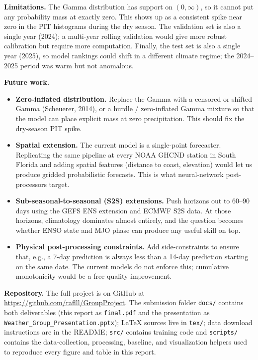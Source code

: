 \documentclass[11pt]{article}
\begin{document}
\textbf{Limitations.} The Gamma distribution has support on $(0, \infty)$, so it cannot put any probability mass at exactly zero. This shows up as a consistent spike near zero in the PIT histograms during the dry season. The validation set is also a single year (2024); a multi-year rolling validation would give more robust calibration but require more computation. Finally, the test set is also a single year (2025), so model rankings could shift in a different climate regime; the 2024--2025 period was warm but not anomalous.

\textbf{Future work.}
\begin{itemize}[leftmargin=1.5em]
    \item \textbf{Zero-inflated distribution.} Replace the Gamma with a censored or shifted Gamma (Scheuerer, 2014), or a hurdle / zero-inflated Gamma mixture so that the model can place explicit mass at zero precipitation. This should fix the dry-season PIT spike.
    \item \textbf{Spatial extension.} The current model is a single-point forecaster. Replicating the same pipeline at every NOAA GHCND station in South Florida and adding spatial features (distance to coast, elevation) would let us produce gridded probabilistic forecasts. This is what neural-network post-processors target.
    \item \textbf{Sub-seasonal-to-seasonal (S2S) extensions.} Push horizons out to 60--90 days using the GEFS ENS extension and ECMWF S2S data. At those horizons, climatology dominates almost entirely, and the question becomes whether ENSO state and MJO phase can produce any useful skill on top.
    \item \textbf{Physical post-processing constraints.} Add side-constraints to ensure that, e.g., a 7-day prediction is always less than a 14-day prediction starting on the same date. The current models do not enforce this; cumulative monotonicity would be a free quality improvement.
\end{itemize}

\textbf{Repository.} The full project is on GitHub at \url{https://github.com/raflll/GroupProject}. The submission folder \texttt{docs/} contains both deliverables (this report as \texttt{final.pdf} and the presentation as \texttt{Weather\_Group\_Presentation.pptx}); LaTeX sources live in \texttt{tex/}; data download instructions are in the README; \texttt{src/} contains training code and \texttt{scripts/} contains the data-collection, processing, baseline, and visualization helpers used to reproduce every figure and table in this report.
\end{document}
